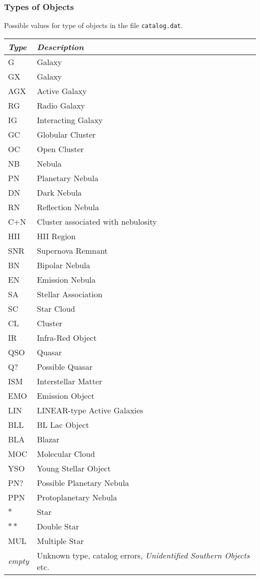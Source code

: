 \subsubsection{Types of Objects}
\label{sec:dso:types}

Possible values for type of objects in the file \texttt{catalog.dat}.

\begin{longtabu} to \textwidth {l|X}
\toprule
\emph{Type} & \emph{Description}\\\midrule
G   & Galaxy\\
GX  & Galaxy\\
AGX & Active Galaxy\\
RG  & Radio Galaxy\\
IG  & Interacting Galaxy\\
GC  & Globular Cluster\\
OC  & Open Cluster\\
NB  & Nebula\\
PN  & Planetary Nebula\\
DN  & Dark Nebula\\
RN  & Reflection Nebula\\
C+N & Cluster associated with nebulosity\\
HII & HII Region\\
SNR & Supernova Remnant\\
BN  & Bipolar Nebula\\
EN  & Emission Nebula\\
SA  & Stellar Association\\
SC  & Star Cloud\\
CL  & Cluster\\
IR  & Infra-Red Object\\
QSO & Quasar\\
Q?  & Possible Quasar\\
ISM & Interstellar Matter\\
EMO & Emission Object\\
LIN & LINEAR-type Active Galaxies\\
BLL & BL Lac Object\\
BLA & Blazar\\
MOC & Molecular Cloud\\
YSO & Young Stellar Object\\
PN? & Possible Planetary Nebula\\
PPN & Protoplanetary Nebula\\
$\ast$ & Star\\
$\ast\ast$ & Double Star\\
MUL & Multiple Star\\
\emph{empty} & Unknown type, catalog errors, \emph{Unidentified Southern Objects} etc.\\
\bottomrule
\end{longtabu}


